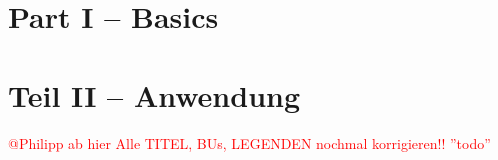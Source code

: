 


\tableofcontents
\thispagestyle{empty}
\newpage
\setcounter{page}{1} 



\newpage
\section{Part I -- Basics}





 

\newpage
\section{Teil II -- Anwendung}
\textcolor{red}{@Philipp ab hier Alle TITEL, BUs, LEGENDEN nochmal korrigieren!! ''todo''}






\newpage

\newpage

